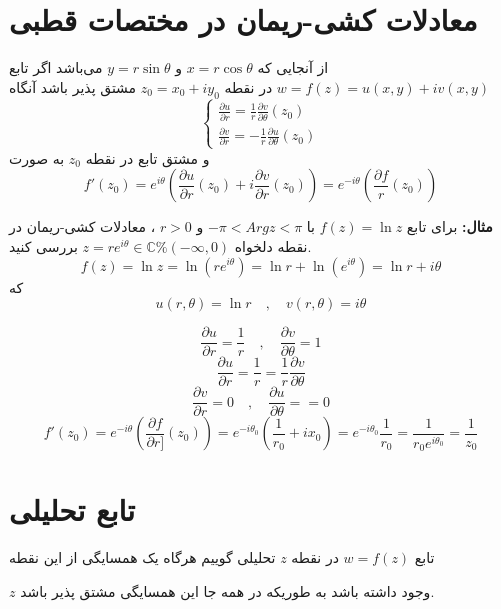 \documentclass[12pt]{report}
\begin{document}
 	 	 	  \section{معادلات کشی-ریمان در مختصات قطبی}
 	 	 	  از آنجایی که
 	 	 	  $x = r\cos \theta$
 	 	 	  و
 	 	 	  $y = r\sin \theta$
 	 	 	  می‌باشد اگر تابع 
 	 	 	  $w = f(z) =u(x, y) + iv(x, y)$
 	 	 	  در نقطه 
 	 	 	  $z_0 = x_0 + iy_0$
 	 	 	  مشتق پذیر باشد آنگاه
 	 	 	  \[
 	 	 	  \begin{cases}
 	 	 	  	\frac{\partial u}{\partial r} = \frac{1}{r} \frac{\partial v}{\partial \theta} (z_0)\\
 	 	 	  	\frac{\partial v}{\partial r} = -\frac{1}{r} \frac{\partial u}{\partial \theta} (z_0)
 	 	 	  	
 	 	 	  \end{cases}
 	 	 	  \] 
 	 	 	  و مشتق تابع در نقطه 
 	 	 	  $z_0$
 	 	 	  به صورت 
 	 	 	  $$f'(z_0) = e^{i \theta}(\frac{\partial u}{\partial r}(z_0) + i\frac{\partial v}{\partial r}(z_0)) = e^{-i\theta}(\frac{\partial f}{r}(z_0))$$
 	 	 	  
 	 	 	  
 	 	 	  \textbf{مثال:}
 	 	 	  برای تابع
 	 	 	  $f(z) = \ln z$
 	 	 	  با
 	 	 	  $-\pi < Arg z < \pi$
 	 	 	  و 
 	 	 	  $r>0$
 	 	 	  ،
 	 	 	  معادلات کشی-ریمان در نقطه دلخواه
 	 	 	  $z = re^{i\theta} \in \mathbb{C} \% (-\infty ,  0)$
 	 	 	  بررسی کنید.
 	 	 	  $$f(z) = \ln z = \ln (re^{i\theta}) = \ln r + \ln (e^{i\theta}) = \ln r + i\theta$$
 	 	 	  که
 	 	 	  $$u(r, \theta) = \ln r \quad , \quad v(r, \theta) = i\theta$$
 	 	 	  
 	 	 	  $$\frac{\partial u}{\partial r} = \frac{1}{r} \quad, \quad \frac{\partial v}{\partial \theta} = 1$$
 	 	 	  $$\frac{\partial u}{\partial r} = \frac{1}{r} = \frac{1}{r} \frac{\partial v}{\partial \theta} $$
 	 	 	  $$\frac{\partial v}{\partial r} = 0 \quad , \quad \frac{\partial u}{\partial \theta} = = 0$$
 	 	 	  $$f'(z_0) = e^{-i\theta}(\frac{\partial f}{\partial r]}(z_0)) = e^{-i \theta_0}(\frac{1}{r_0} + ix_0) = e^{-i \theta_0} \frac{1}{r_0} = \frac{1}{r_0e^{i\theta_0}} = \frac{1}{z_0}$$
 	 	 	  
 	 	 	  \section{تابع تحلیلی}
 	 	 	  تابع 
 	 	 	  $w= f(z)$
 	 	 	  در نقطه 
 	 	 	  $z$
 	 	 	  تحلیلی گوییم هرگاه یک همسایگی از این نقطه 
 	 	 	  
 	 	 	  $z$
 	 	 	  وجود داشته باشد به طوریکه در همه جا این همسایگی مشتق پذیر باشد.
 	 	 	  \newline
 	 	 	  
\end{document}
